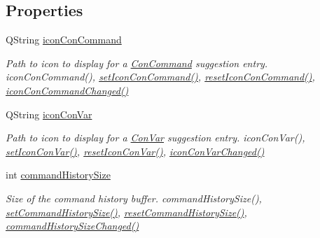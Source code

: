 \subsection*{Properties}
\begin{DoxyCompactItemize}
\item 
\hypertarget{class_command_entry_box_ac53924ba07f11bab5b255af0625ffbd6}{Q\-String \hyperlink{class_command_entry_box_ac53924ba07f11bab5b255af0625ffbd6}{icon\-Con\-Command}}\label{class_command_entry_box_ac53924ba07f11bab5b255af0625ffbd6}

\begin{DoxyCompactList}\small\item\em Path to icon to display for a \hyperlink{class_con_command}{Con\-Command} suggestion entry.  icon\-Con\-Command(), \hyperlink{class_command_entry_box_a5fc40503d8f9b6bf8faddc42ff6663bb}{set\-Icon\-Con\-Command()}, \hyperlink{class_command_entry_box_a9807265bf78369d6dfbc8210aa39c562}{reset\-Icon\-Con\-Command()}, \hyperlink{class_command_entry_box_ac13c5c8a5aa22fd0fb264010ee271ea8}{icon\-Con\-Command\-Changed()} \end{DoxyCompactList}\item 
\hypertarget{class_command_entry_box_ad069b345272bd9d2fe43266ac5ead588}{Q\-String \hyperlink{class_command_entry_box_ad069b345272bd9d2fe43266ac5ead588}{icon\-Con\-Var}}\label{class_command_entry_box_ad069b345272bd9d2fe43266ac5ead588}

\begin{DoxyCompactList}\small\item\em Path to icon to display for a \hyperlink{class_con_var}{Con\-Var} suggestion entry.  icon\-Con\-Var(), \hyperlink{class_command_entry_box_a9e4387c47cb2de50da44360110d9e59a}{set\-Icon\-Con\-Var()}, \hyperlink{class_command_entry_box_a85705eaae1055472de96c07142cf56af}{reset\-Icon\-Con\-Var()}, \hyperlink{class_command_entry_box_a971a6587e79b6420a09963c09daa61a4}{icon\-Con\-Var\-Changed()} \end{DoxyCompactList}\item 
\hypertarget{class_command_entry_box_ad659bb8ce66cbf009d51d31ca2589207}{int \hyperlink{class_command_entry_box_ad659bb8ce66cbf009d51d31ca2589207}{command\-History\-Size}}\label{class_command_entry_box_ad659bb8ce66cbf009d51d31ca2589207}

\begin{DoxyCompactList}\small\item\em Size of the command history buffer.  command\-History\-Size(), \hyperlink{class_command_entry_box_a96513e1f106fbf5e734c6a4ff7a26e2d}{set\-Command\-History\-Size()}, \hyperlink{class_command_entry_box_ad81eaeb870ed56bc231cd962d527b520}{reset\-Command\-History\-Size()}, \hyperlink{class_command_entry_box_a89f2868238ec30998795c227fbaab143}{command\-History\-Size\-Changed()} \end{DoxyCompactList}\end{DoxyCompactItemize}


